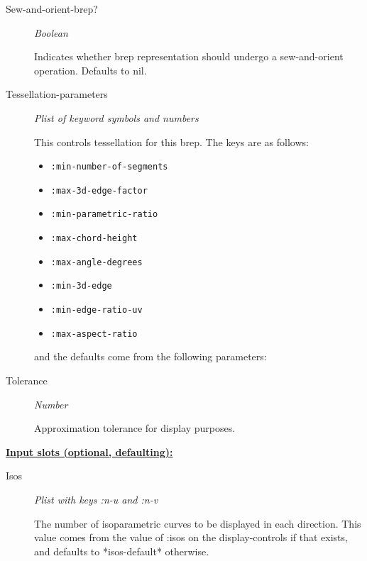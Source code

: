 \documentclass [11pt]{book}
\begin{document}
\begin{itemize}
\begin{description}
\item [Sew-and-orient-brep?]
\emph{Boolean}

 Indicates whether brep representation should undergo a
sew-and-orient operation. Defaults to nil.




\item [Tessellation-parameters]
\emph{Plist of keyword symbols and numbers}

 This controls tessellation for this brep.
The keys are as follows:

\begin{itemize}

\item \texttt{:min-number-of-segments}
\texttt{}
\item \texttt{:max-3d-edge-factor}
\texttt{}
\item \texttt{:min-parametric-ratio}
\texttt{}
\item \texttt{:max-chord-height}
\texttt{}
\item \texttt{:max-angle-degrees}
\texttt{}
\item \texttt{:min-3d-edge}
\texttt{}
\item \texttt{:min-edge-ratio-uv}
\texttt{}
\item \texttt{:max-aspect-ratio}

\end{itemize}

\texttt{}
and the defaults come from the following parameters:
\texttt{}

\texttt{}



\item [Tolerance]
\emph{Number}

 Approximation tolerance for display purposes.




\end{description}






\textbf{
\underline{Input slots (optional, defaulting):}}

\begin{description}

\item [Isos]
\emph{Plist with keys :n-u and :n-v}

 The number of isoparametric
curves to be displayed in each direction. This value comes from the
value of :isos on the display-controls if that exists, and defaults
to *isos-default* otherwise.





\end{description}
\end{itemize}
\end{document}
